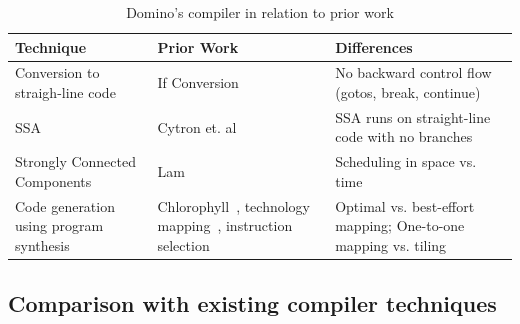 \begin{table}[!t]
  \begin{scriptsize}
    \begin{tabular}{|p{}|p{}|p{}|}
  \hline
  Technique & Prior Work & Differences \\
  \hline
  Conversion to straigh-line code & If Conversion~\cite{if_conversion} & No backward control flow (gotos, break, continue) \\
  \hline
  SSA & Cytron et. al~\cite{ssa} & SSA runs on straight-line code with no branches \\
  \hline
  Strongly Connected Components & Lam~\cite{software_pipelining} & Scheduling in space vs. time \\ %
  \hline
  Code generation using program synthesis & Chlorophyll~\cite{chlorophyll}, technology mapping~\cite{micheli, flowmap, spectransform}, instruction selection~\cite{muchnik} & Optimal vs. best-effort mapping; One-to-one mapping vs. tiling \\
  \hline
  \end{tabular}
  \end{scriptsize}
  \caption{Domino's compiler in relation to prior work}
  \label{tab:prior_compiler}
\end{table}

\subsection{Comparison with existing compiler techniques}

